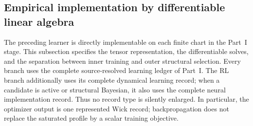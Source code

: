 \documentclass[11pt]{article}
\numberwithin{section}{part}
\theoremstyle{plain}
\theoremstyle{definition}
\theoremstyle{remark}
\begin{document}
\subsection{Empirical implementation by differentiable linear algebra}
\label{subsec:wick-empirical-implementation}

The preceding learner is directly implementable on each finite chart in the
Part~I stage.  This subsection specifies the tensor representation, the
differentiable solves, and the separation between inner training and outer
structural selection.  Every branch uses the complete source-resolved
learning ledger of Part~I.  The RL branch additionally uses its complete
dynamical learning record; when a candidate is active or structural
Bayesian, it also uses the complete neural implementation record.  Thus no
record type is silently enlarged.  In particular, the optimizer output is
one represented Wick record; backpropagation does not replace the saturated
profile by a scalar training objective.
\end{document}
